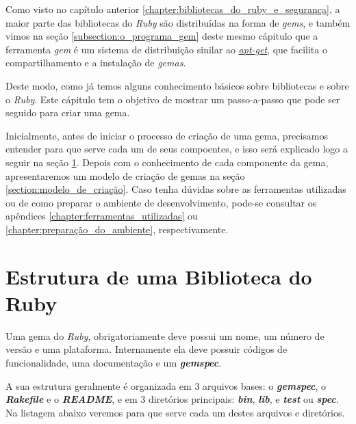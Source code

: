 Como visto no capítulo anterior \ref{chapter:bibliotecas_do_ruby_e_segurança}, a maior parte das bibliotecas do
\emph{Ruby} são distribuídas na forma de \emph{gems}, e também vimos na seção
\ref{subsection:o_programa_gem} deste mesmo cápitulo que a ferramenta \emph{gem} é um sistema de distribuição
sinilar ao  \emph{\href{https://packages.qa.debian.org/a/apt.html}{apt-get}}, que facilita o compartilhamento e a
instalação de \emph{gemas}.

Deste modo, como já temos alguns conhecimento básicos sobre bibliotecas e sobre o \emph{Ruby}. Este cápitulo
tem o objetivo de mostrar um passo-a-passo que pode ser seguido para criar uma gema.


Inicialmente, antes de iniciar o processo de criação de uma gema, precisamos entender para que serve cada um
de seus compoentes, e isso será explicado logo a seguir na seção \ref{section:estrutura_de_uma_biblioteca_do_ruby}.
Depois com o conhecimento de cada componente da gema, apresentaremos um modelo de criação de gemas
na seção \ref{section:modelo_de_criação}. Caso tenha dúvidas sobre as ferramentas utilizadas ou de como preparar
o ambiente de desenvolvimento, pode-se consultar os apêndices \ref{chapter:ferramentas_utilizadas} ou
\ref{chapter:preparação_do_ambiente}, respectivamente.


\section{Estrutura de uma Biblioteca do Ruby}
\label{section:estrutura_de_uma_biblioteca_do_ruby}

Uma gema do \emph{Ruby}, obrigatoriamente deve possui um nome, um número de versão e uma plataforma.
Internamente ela deve possuir códigos de funcionalidade, uma documentação e um \emph{\textbf{gemspec}}.

A sua estrutura geralmente é organizada em 3 arquivos bases: o \emph{\textbf{gemspec}}, o
\emph{\textbf{Rakefile}} e o \emph{\textbf{README}}, e em 3 diretórios principais: \emph{\textbf{bin}},
\emph{\textbf{lib}}, e \emph{\textbf{test}} ou \emph{\textbf{spec}}. Na listagem abaixo veremos para que
serve cada um destes arquivos e diretórios.

